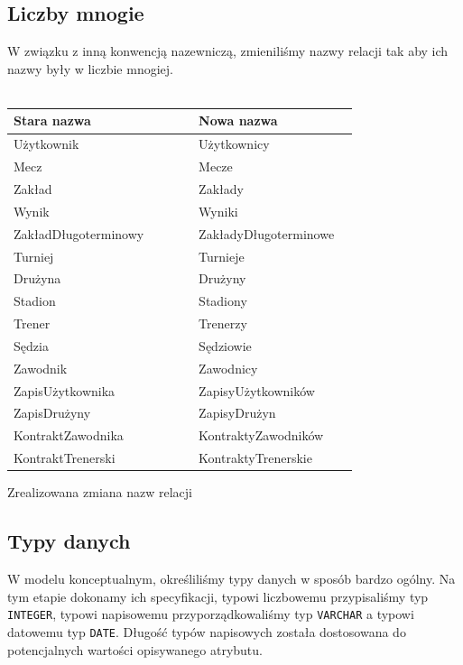 \documentclass{mwrep}
\begin{document}
\subsection{Liczby mnogie}
W związku z inną konwencją nazewniczą, zmieniliśmy nazwy relacji tak aby ich nazwy były w liczbie mnogiej.\\
\\
\begin{threeparttable}[H]
	\begin{tabular}{|p{0.5\linewidth}|p{0.43\linewidth}|}
	\hline
	Stara nazwa & Nowa nazwa \\ \hline
	Użytkownik & Użytkownicy \\ \hline
	Mecz & Mecze \\ \hline
	Zakład & Zakłady \\ \hline
	Wynik & Wyniki \\ \hline
	ZakładDługoterminowy & ZakładyDługoterminowe \\ \hline
	Turniej & Turnieje \\ \hline
	Drużyna & Drużyny \\ \hline
	Stadion & Stadiony \\ \hline
	Trener & Trenerzy \\ \hline
	Sędzia & Sędziowie \\ \hline
	Zawodnik & Zawodnicy \\ \hline
	ZapisUżytkownika & ZapisyUżytkowników \\ \hline
	ZapisDrużyny & ZapisyDrużyn \\ \hline
	KontraktZawodnika & KontraktyZawodników \\ \hline
	KontraktTrenerski & KontraktyTrenerskie \\ \hline
	\end{tabular}	
	\caption{Zrealizowana zmiana nazw relacji}
\end{threeparttable}
\vspace{0.5cm}

\subsection{Typy danych}
W modelu konceptualnym, określiliśmy typy danych w sposób bardzo ogólny. Na tym etapie dokonamy ich 
specyfikacji, typowi liczbowemu przypisaliśmy typ \texttt{INTEGER}, typowi napisowemu przyporządkowaliśmy typ \texttt{VARCHAR}
a typowi datowemu typ \texttt{DATE}. Długość typów napisowych została dostosowana do potencjalnych wartości opisywanego atrybutu.
\end{document}
